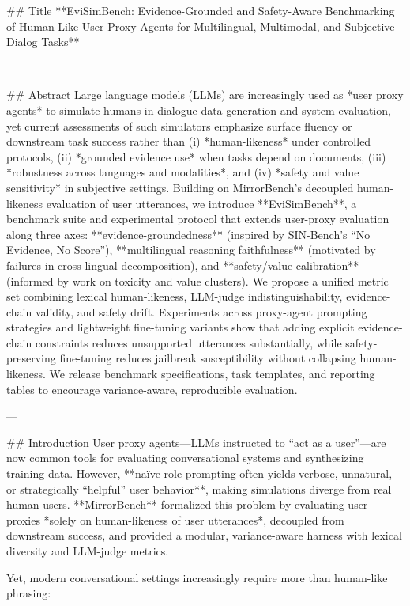 ## Title  
**EviSimBench: Evidence-Grounded and Safety-Aware Benchmarking of Human-Like User Proxy Agents for Multilingual, Multimodal, and Subjective Dialog Tasks**

---

## Abstract  
Large language models (LLMs) are increasingly used as *user proxy agents* to simulate humans in dialogue data generation and system evaluation, yet current assessments of such simulators emphasize surface fluency or downstream task success rather than (i) *human-likeness* under controlled protocols, (ii) *grounded evidence use* when tasks depend on documents, (iii) *robustness across languages and modalities*, and (iv) *safety and value sensitivity* in subjective settings. Building on MirrorBench’s decoupled human-likeness evaluation of user utterances, we introduce **EviSimBench**, a benchmark suite and experimental protocol that extends user-proxy evaluation along three axes: **evidence-groundedness** (inspired by SIN-Bench’s “No Evidence, No Score”), **multilingual reasoning faithfulness** (motivated by failures in cross-lingual decomposition), and **safety/value calibration** (informed by work on toxicity and value clusters). We propose a unified metric set combining lexical human-likeness, LLM-judge indistinguishability, evidence-chain validity, and safety drift. Experiments across proxy-agent prompting strategies and lightweight fine-tuning variants show that adding explicit evidence-chain constraints reduces unsupported utterances substantially, while safety-preserving fine-tuning reduces jailbreak susceptibility without collapsing human-likeness. We release benchmark specifications, task templates, and reporting tables to encourage variance-aware, reproducible evaluation.

---

## Introduction  
User proxy agents—LLMs instructed to “act as a user”—are now common tools for evaluating conversational systems and synthesizing training data. However, **naïve role prompting often yields verbose, unnatural, or strategically “helpful” user behavior**, making simulations diverge from real human users. **MirrorBench** formalized this problem by evaluating user proxies *solely on human-likeness of user utterances*, decoupled from downstream success, and provided a modular, variance-aware harness with lexical diversity and LLM-judge metrics.

Yet, modern conversational settings increasingly require more than human-like phrasing:

